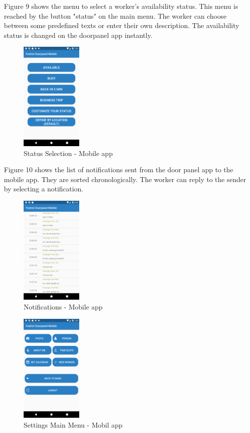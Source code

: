 \documentclass[article,colorback,accentcolor=tud4c, 11pt]{tudreport}
\begin{document}
Figure 9 shows the menu to select a worker's availability status. This menu is reached by the button "status" on the main menu. The worker can choose between some predefined texts or enter their own description. The availability status is changed on the doorpanel app instantly.\\
 
	\begin{figure}
		\centering
		\includegraphics[width=30mm,scale=0.8]{mobile/Status-selection.png}
		\caption{Status Selection - Mobile app}
	\end{figure}
	
Figure 10 shows the list of notifications sent from the door panel app to the mobile app. They are sorted chronologically. The worker can reply to the sender by selecting a notification. \\
 
	\begin{figure}
		\centering
		\includegraphics[width=30mm,scale=0.8]{mobile/Notifications.png}
		\caption{Notifications - Mobile app}
	\end{figure}

	\begin{figure}
		\centering
		\includegraphics[width=30mm,scale=0.8]{mobile/Settings.png}
		\caption{Settings Main Menu - Mobil app}
	\end{figure}	
\end{document}
